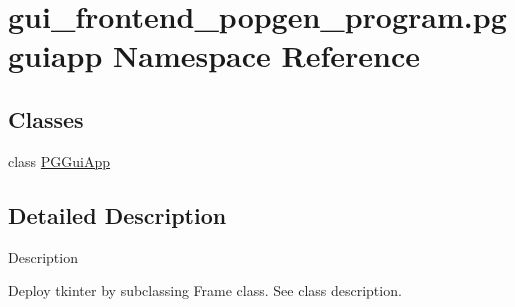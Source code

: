 \hypertarget{namespacegui__frontend__popgen__program_1_1pgguiapp}{}\section{gui\+\_\+frontend\+\_\+popgen\+\_\+program.\+pgguiapp Namespace Reference}
\label{namespacegui__frontend__popgen__program_1_1pgguiapp}
\subsection*{Classes}
\begin{DoxyCompactItemize}
\item 
class \hyperlink{classgui__frontend__popgen__program_1_1pgguiapp_1_1PGGuiApp}{P\+G\+Gui\+App}
\end{DoxyCompactItemize}


\subsection{Detailed Description}
\begin{DoxyVerb}Description

Deploy tkinter by subclassing Frame class.  See class description.
\end{DoxyVerb}
 